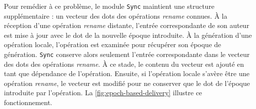 \documentclass[12pt]{thesul}
\begin{document}
Pour remédier à ce problème, le module \texttt{Sync} maintient une structure supplémentaire : un vecteur des dots des opérations \emph{rename} connues.
À la réception d'une opération \emph{rename} distante, l'entrée correspondante de son auteur est mise à jour avec le dot de la nouvelle époque introduite.
À la génération d'une opération locale, l'opération est examinée pour récupérer son époque de génération.
\texttt{Sync} conserve alors seulement l'entrée correspondante dans le vecteur des dots des opérations \emph{rename}.
À ce stade, le contenu du vecteur est ajouté en tant que dépendance de l'opération.
Ensuite, si l'opération locale s'avère être une opération \emph{rename}, le vecteur est modifié pour ne conserver que le dot de l'époque introduite par l'opération.
La \autoref{fig:epoch-based-delivery} illustre ce fonctionnement.
\end{document}
